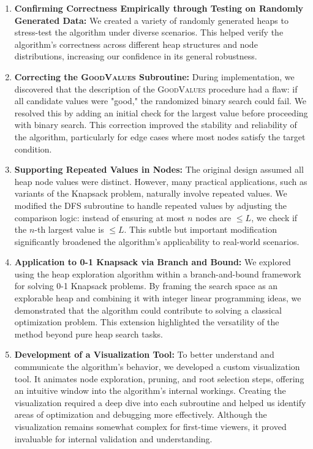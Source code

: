 \documentclass[conference]{IEEEtran}
\begin{document}
\begin{enumerate}
    \item \textbf{Confirming Correctness Empirically through Testing on Randomly Generated Data:}  
    We created a variety of randomly generated heaps to stress-test the algorithm under diverse scenarios. This helped verify the algorithm's correctness across different heap structures and node distributions, increasing our confidence in its general robustness.

    \item \textbf{Correcting the \textsc{GoodValues} Subroutine:}  
    During implementation, we discovered that the description of the \textsc{GoodValues} procedure had a flaw: if all candidate values were "good," the randomized binary search could fail. We resolved this by adding an initial check for the largest value before proceeding with binary search. This correction improved the stability and reliability of the algorithm, particularly for edge cases where most nodes satisfy the target condition.

    \item \textbf{Supporting Repeated Values in Nodes:}  
    The original design assumed all heap node values were distinct. However, many practical applications, such as variants of the Knapsack problem, naturally involve repeated values. We modified the \textsc{DFS} subroutine to handle repeated values by adjusting the comparison logic: instead of ensuring at most $n$ nodes are $\leq L$, we check if the $n$-th largest value is $\leq L$. This subtle but important modification significantly broadened the algorithm's applicability to real-world scenarios.

    \item \textbf{Application to 0-1 Knapsack via Branch and Bound:}  
    We explored using the heap exploration algorithm within a branch-and-bound framework for solving 0-1 Knapsack problems. By framing the search space as an explorable heap and combining it with integer linear programming ideas, we demonstrated that the algorithm could contribute to solving a classical optimization problem. This extension highlighted the versatility of the method beyond pure heap search tasks.

    \item \textbf{Development of a Visualization Tool:}  
    To better understand and communicate the algorithm's behavior, we developed a custom visualization tool. It animates node exploration, pruning, and root selection steps, offering an intuitive window into the algorithm's internal workings. Creating the visualization required a deep dive into each subroutine and helped us identify areas of optimization and debugging more effectively. Although the visualization remains somewhat complex for first-time viewers, it proved invaluable for internal validation and understanding.
\end{enumerate}
\end{document}
